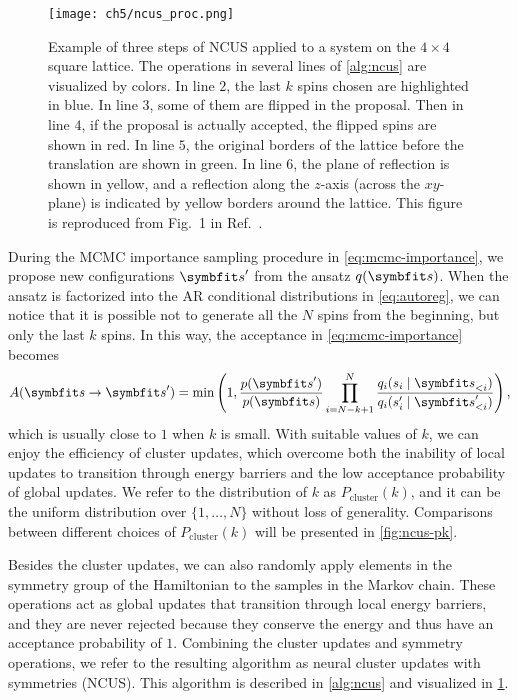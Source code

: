 \begin{figure}[htb]
\centering
\texttt{[image: ch5/ncus\_proc.png]}
\caption[Procedure of neural cluster updates with symmetries (NCUS)]{
Example of three steps of NCUS applied to a system on the $4 \times 4$ square lattice. The operations in several lines of \cref{alg:ncus} are visualized by colors.
In line $2$, the last $k$ spins chosen are highlighted in {\color[HTML]{1f77b4} blue}.
In line $3$, some of them are flipped in the proposal.
Then in line $4$, if the proposal is actually accepted, the flipped spins are shown in {\color[HTML]{d62728} red}.
In line $5$, the original borders of the lattice before the translation are shown in {\color[HTML]{2ca02c} green}.
In line $6$, the plane of reflection is shown in {\color[HTML]{bcbd22} yellow}, and a reflection along the $z$-axis (across the $x y$-plane) is indicated by yellow borders around the lattice.
This figure is reproduced from Fig.~1 in Ref.~\cite{wu2021unbiased}.
}
\label{fig:ncus-proc}
\end{figure}

During the MCMC importance sampling procedure in \cref{eq:mcmc-importance}, we propose new configurations $\vs'$ from the ansatz $q(\vs)$. When the ansatz is factorized into the AR conditional distributions in \cref{eq:autoreg}, we can notice that it is possible not to generate all the $N$ spins from the beginning, but only the last $k$ spins. In this way, the acceptance in \cref{eq:mcmc-importance} becomes
\begin{equation}
A(\vs \to \vs') = \min\left( 1, \frac{p(\vs')}{p(\vs)} \prod_{i = N - k + 1}^N \frac{q_i(s_i \mid \vs_{< i})}{q_i(s'_i \mid \vs'_{< i})} \right),
\label{eq:ncus-a}
\end{equation}
which is usually close to $1$ when $k$ is small. With suitable values of $k$, we can enjoy the efficiency of cluster updates, which overcome both the inability of local updates to transition through energy barriers and the low acceptance probability of global updates. We refer to the distribution of $k$ as $P_\text{cluster}(k)$, and it can be the uniform distribution over $\{1, \ldots, N\}$ without loss of generality. Comparisons between different choices of $P_\text{cluster}(k)$ will be presented in \cref{fig:ncus-pk}.

Besides the cluster updates, we can also randomly apply elements in the symmetry group of the Hamiltonian to the samples in the Markov chain. These operations act as global updates that transition through local energy barriers, and they are never rejected because they conserve the energy and thus have an acceptance probability of $1$. Combining the cluster updates and symmetry operations, we refer to the resulting algorithm as neural cluster updates with symmetries (NCUS). This algorithm is described in \cref{alg:ncus} and visualized in \cref{fig:ncus-proc}.


